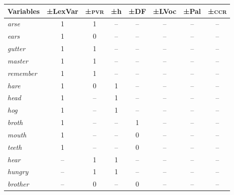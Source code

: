 {{{\begin{table}
\begin{tabularx}{.9\textwidth}{Xccccccc}
\lsptoprule 
Variables & ±LexVar & ±\textsc{pvr} & ±h & ±DF & ±LVoc & ±Pal & ±\textsc{ccr}  \\
\midrule 
\emph{arse} \cellcolor{green!35} & 1\cellcolor{green!35} & 1\cellcolor{green!35} & -- & -- & --  & -- & --  \\  
\emph{ears} \cellcolor{green!35} & 1\cellcolor{green!35} & 0\cellcolor{green!35} & -- & -- & --  & -- & --   \\  
\emph{gutter} \cellcolor{green!35} & 1\cellcolor{green!35} & 1\cellcolor{green!35} & -- & -- & --  & -- & --   \\  
\emph{master} \cellcolor{green!35} & 1\cellcolor{green!35} & 1\cellcolor{green!35} & -- & -- & --  & -- & --   \\  
\emph{remember} \cellcolor{green!35} & 1\cellcolor{green!35} & 1\cellcolor{green!35} & -- & -- & --  & -- & -- \\  
\emph{hare} \cellcolor{green!35} & 1\cellcolor{green!35} & 0 \cellcolor{green!35}& 1\cellcolor{green!35} & -- & --  & -- & --  \\  
\emph{head}\cellcolor{green!35} & 1\cellcolor{green!35} & --\cellcolor{green!35} & 1\cellcolor{green!35} & -- & --  & -- & --  \\  
\emph{hog} \cellcolor{green!35} & 1\cellcolor{green!35} & -- \cellcolor{green!35}& 1\cellcolor{green!35} & -- & --  & -- & --  \\ 
\emph{broth} \cellcolor{green!35} & 1\cellcolor{green!35} & --\cellcolor{green!35} & --\cellcolor{green!35} & 1\cellcolor{green!35} & --  & -- & -- \\
\emph{mouth} \cellcolor{green!35} & 1\cellcolor{green!35} & --\cellcolor{green!35} & --\cellcolor{green!35} & 0\cellcolor{green!35} & --  & -- & --  \\  
\emph{teeth} \cellcolor{green!35} & 1\cellcolor{green!35} & --\cellcolor{green!35} & --\cellcolor{green!35} & 0\cellcolor{green!35} & --  & -- & --  \\  
\emph{hear} \cellcolor{blue!35} & \cellcolor{blue!35} -- & \cellcolor{blue!35} 1 & \cellcolor{blue!35} 1 & -- & --  & -- & --  \\  
\emph{hungry} \cellcolor{blue!35} & \cellcolor{blue!35} -- & \cellcolor{blue!35} 1 & \cellcolor{blue!35} 1 & -- & --  & -- & --  \\ 
\emph{brother}\cellcolor{blue!35}  &\cellcolor{blue!35}  -- &\cellcolor{blue!35}  0 &\cellcolor{blue!35}  -- & \cellcolor{blue!35} 0 & --  & -- & --  \\ 

\end{tabularx}
\end{table}}}}
